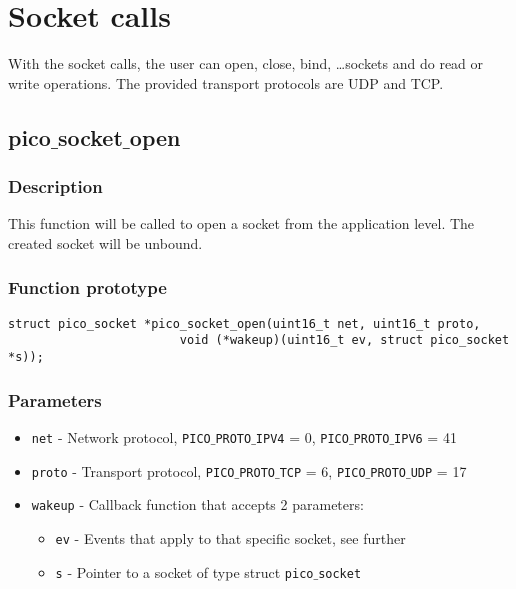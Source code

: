 \section{Socket calls}

With the socket calls, the user can open, close, bind, \ldots sockets and do read
or write operations. The provided transport protocols are UDP and TCP.

\subsection{pico$\_$socket$\_$open}

\subsubsection*{Description}
This function will be called to open a socket from the application level. The created
socket will be unbound.

\subsubsection*{Function prototype}
\begin{verbatim}
struct pico_socket *pico_socket_open(uint16_t net, uint16_t proto,
						void (*wakeup)(uint16_t ev, struct pico_socket *s));
\end{verbatim}

\subsubsection*{Parameters}
\begin{itemize}
\item \texttt{net} - Network protocol, \texttt{PICO$\_$PROTO$\_$IPV4} = 0, \texttt{PICO$\_$PROTO$\_$IPV6} = 41
\item \texttt{proto} - Transport protocol, \texttt{PICO$\_$PROTO$\_$TCP} = 6, \texttt{PICO$\_$PROTO$\_$UDP} = 17
\item \texttt{wakeup} - Callback function that accepts 2 parameters:
\begin{itemize}
\item \texttt{ev} - Events that apply to that specific socket, see further
\item \texttt{s} - Pointer to a socket of type struct \texttt{pico$\_$socket}
\end{itemize}
\end{itemize}

